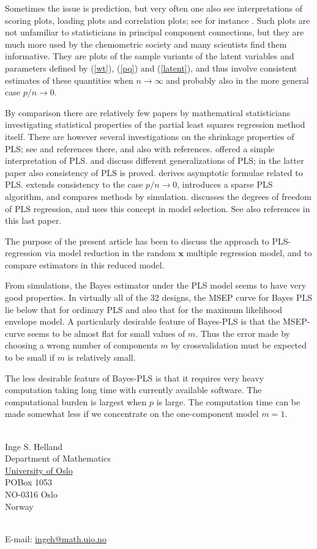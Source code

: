 \documentclass[a4paper, 11pt]{article}
\begin{document}
Sometimes the issue is prediction, but very often one also see interpretations of scoring plots, loading plots and correlation plots; see for instance \citet{martens2001multivariate}. Such plots are not unfamiliar to statisticians in principal component connections, but they are much more used by the chemometric society and many scientists find them informative. They are plots of the sample variants of the latent variables and parameters defined by (\ref{wt}), (\ref{pq}) and (\ref{latent}), and thus involve consistent estimates of these quantities when $n\rightarrow\infty$ and probably also in the more general case $p/n\rightarrow 0$.

By comparison there are relatively few papers by mathematical statisticians
investigating statistical properties of the partial least squares regression
method itself. There are however several investigations on the shrinkage
properties of PLS; see \citet{kramer2007overview} and references there, and also \citet{foschigeometry} with references. \citet{garthwaite1994interpretation} offered a simple interpretation of PLS. \citet{stone1990continuum} and \citet{naik2000partial} discuss different generalizations of PLS; in the latter paper also consistency of PLS is proved. \citet{stoica1998partial} derives asymptotic formulae related to PLS. \citet{chun2010sparse} extends consistency to the case $p/n\rightarrow 0$, introduces a sparse PLS algorithm, and compares methods by simulation. \citet{kramer2012degrees} discusses the degrees of freedom of PLS regression, and uses this concept in model selection. See also references in this last paper.

The purpose of the present article has been to discuss the approach to PLS-regression via model reduction in the random $\bm{x}$ multiple regression model, and to compare estimators in this reduced model.

From simulations, the Bayes estimator under the PLS model seems to have very good properties. In virtually all of the 32 designs, the MSEP curve for Bayes PLS lie below that for ordinary PLS and also that for the maximum likelihood envelope model. A particularly desirable feature of Bayes-PLS is that the MSEP-curve seems to be almost flat for small values of $m$. Thus the error made by choosing a wrong number of components $m$ by crossvalidation must be expected to be small if $m$ is relatively small.

The less desirable featurs of Bayes-PLS is that it requires very heavy computation taking long time with currently available software. The computational burden is largest when $p$ is large. The computation time can be made somewhat  less if we concentrate on the one-component model $m=1$.



\bigskip

\ \\
Inge S. Helland \\
Department of Mathematics \\
\href{http://uio.no}{University of Oslo} \\
POBox 1053 \\
NO-0316 Oslo \\
Norway

\ \\
E-mail: \href{mailto:ingeh@math.uio.no}{ingeh@math.uio.no}
\end{document}
